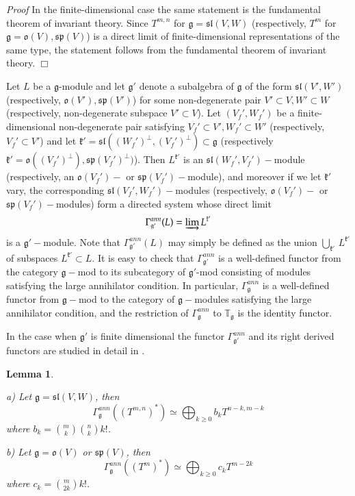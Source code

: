 \documentclass[10pt]{amsart}
\newcounter{theorem}
\newtheorem{lemma}[theo]{Lemma}
\renewenvironment{proof}{ \emph{Proof}}{$\Box$}
\renewcommand{\sp}{\mathfrak{sp}}
\renewcommand{\sl}{\mathfrak{sl}}
\newcommand{\kk}{\mathfrak{k}}
\newcommand{\oo}{\mathfrak{o}}
\renewcommand{\gg}{\mathfrak{g}}
\begin{document}
\begin{proof} In the finite-dimensional case the same statement is the fundamental theorem of invariant theory. Since $T^{m,n}$ for $\gg = \sl(V,W)$ (respectively, $T^m$ for $\gg = \oo(V),\sp(V)$) is a direct limit of finite-dimensional representations of the same type, the statement follows from the fundamental theorem of invariant theory. 
\end{proof}

Let $L$ be a $\gg$-module and let $\gg'$ denote a subalgebra of $\gg$
of the form $\sl(V', W')$ (respectively, $\oo(V'),\sp(V')$) 
for some non-degenerate pair 
$V'\subset V, W'\subset W$ (respectively, non-degenerate subspace $V' \subset V$). 
Let $(V_f',W_f')$ be a finite-dimensional non-degenerate pair satisfying
$V_f'\subset V', W_f'\subset W'$ (respectively, $V_f'\subset V'$) and
let 
$\kk'=\sl((W_f')^\perp,(V_f')^\perp)\subset \gg$ (respectively $\kk'=\oo((V_f')^\perp), \sp(V_f')^\perp)$). 
Then $L^{\kk'}$ is an $\sl(W_f',V_f')-$module (respectively, an
$\oo(V_f')-$ or $\sp(V_f')-$module), 
and moreover if we let $\kk'$ vary, the corresponding
$\sl(V_f',W_f')-$modules 
(respectively, $\oo(V_f')-$ or $\sp(V_f')-$modules) form a directed
system whose direct limit 
$$\Gamma^{ann}_{\gg'}(L) = \varinjlim L^{\kk'}$$ is a $\gg'-$module. Note
that $\Gamma_{\gg'}^{ann}(L)$ may simply be defined as the union
$\bigcup_{\kk'}\,L^{\kk'}$ of subspaces $L^{\kk'} \subset L$. It is easy to
check that 
$\Gamma^{ann}_{\gg'}$ is a well-defined functor from the category
$\gg-$mod to its subcategory of $\gg'$-mod consisting of modules
satisfying the large annihilator condition. In particular,
$\Gamma_\gg^{ann}$ is a well-defined functor from $\gg-$mod to the category
of $\gg-$modules satisfying the large annihilator condition, and the
restriction of 
$\Gamma^{ann}_\gg$ to $\mathbb T_\gg$ is the identity functor.

In the case when $\gg'$ is finite dimensional the functor $\Gamma^{ann}_{\gg'}$ and its right derived functors are studied in detail in \cite{SSW}. 

\begin{lemma}\label{inv2} 

a) Let $\gg=\sl(V,W)$, then
$$\Gamma_\gg^{ann}((T^{m,n})^*) \simeq \bigoplus_{k\geq0}b_kT^{n-k,m-k}$$
where $b_k=\binom{m}{k}\binom{n}{k}k!$.

b)  Let $\gg=\oo(V)$ or $\sp(V)$, then
$$\Gamma_\gg^{ann}((T^m)^*) \simeq \bigoplus_{k\geq0}c_kT^{m-2k}$$
where $c_k=\binom{m}{2k}k!$.
\end{lemma} 
\end{document}
